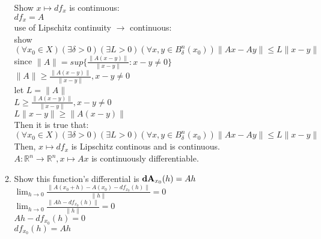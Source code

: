 \documentclass[12pt,letter]{article}
\newcommand{\R}{\mathbb{R}}
\begin{document}
\begin{itemize}
\begin{enumerate}
    Show $x \mapsto df_x$ is continuous:\\
    $df_x=A$\\
    use of Lipschitz continuity $\rightarrow$ continuous:\\
    show $(\forall x_0 \in X)(\exists \delta>0)(\exists L>0)(\forall x,y \in B_{\delta}^n(x_0)) \|Ax-Ay\| \leq L \|x-y\|$\\
    since $\|A\| = sup\{ \frac{\|A(x-y)\|}{\|x-y\|}: x-y \neq 0 \}$\\
    $\|A\| \geq \frac{\|A(x-y)\|}{\|x-y\|}, x-y \neq 0$\\
    let $L=\|A\|$\\
    $L \geq \frac{\|A(x-y)\|}{\|x-y\|}, x-y \neq 0$\\
    $L \|x-y\| \geq \|A(x-y)\|$\\
    Then it is true that:\\
    $(\forall x_0 \in X)(\exists \delta>0)(\exists L>0)(\forall x,y \in B_{\delta}^n(x_0)) \|Ax-Ay\| \leq L \|x-y\|$\\
    Then, $x \mapsto df_x$ is Lipschitz continous and is continuous.\\
    $A: \R^n\rightarrow\R^n, x \mapsto Ax$ is continuously differentiable.
  \item
    Show this function's differential is $\bold{dA}_{x_0}(h)=Ah$\\
    $\lim_{h \to 0}\frac{\|A(x_0+h)-A(x_0)-df_{x_0}(h)\|}{\|h\|}=0$\\
    $\lim_{h \to 0}\frac{\|Ah-df_{x_0}(h)\|}{\|h\|}=0$\\
    $Ah-df_{x_0}(h)=0$\\
    $df_{x_0}(h)=Ah$\\
    
  \end{enumerate}

  \pagebreak
  

\end{itemize}
\end{document}
